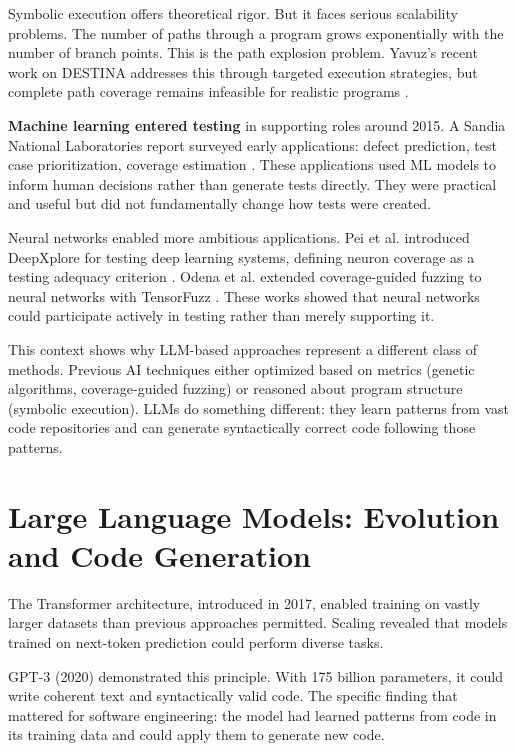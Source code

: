 Symbolic execution offers theoretical rigor. But it faces serious scalability problems. The number of paths through a program grows exponentially with the number of branch points. This is the path explosion problem. Yavuz's recent work on DESTINA addresses this through targeted execution strategies, but complete path coverage remains infeasible for realistic programs \cite{DESTINA2024}.

\textbf{Machine learning entered testing} in supporting roles around 2015. A Sandia National Laboratories report surveyed early applications: defect prediction, test case prioritization, coverage estimation \cite{MLFuzzReviewSandia2019}. These applications used ML models to inform human decisions rather than generate tests directly. They were practical and useful but did not fundamentally change how tests were created.

Neural networks enabled more ambitious applications. Pei et al. introduced DeepXplore for testing deep learning systems, defining neuron coverage as a testing adequacy criterion \cite{DeepXplore2017}. Odena et al. extended coverage-guided fuzzing to neural networks with TensorFuzz \cite{TensorFuzz2019}. These works showed that neural networks could participate actively in testing rather than merely supporting it.

This context shows why LLM-based approaches represent a different class of methods. Previous AI techniques either optimized based on metrics (genetic algorithms, coverage-guided fuzzing) or reasoned about program structure (symbolic execution). LLMs do something different: they learn patterns from vast code repositories and can generate syntactically correct code following those patterns.

\section{Large Language Models: Evolution and Code Generation}
\label{sec:lit_llm_evolution}

The Transformer architecture, introduced in 2017, enabled training on vastly larger datasets than previous approaches permitted. Scaling revealed that models trained on next-token prediction could perform diverse tasks.

GPT-3 (2020) demonstrated this principle. With 175 billion parameters, it could write coherent text and syntactically valid code. The specific finding that mattered for software engineering: the model had learned patterns from code in its training data and could apply them to generate new code.

